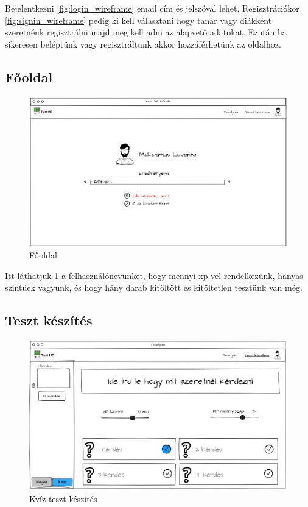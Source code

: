 Bejelentkezni \ref{fig:login_wireframe} email cím és jelszóval lehet. Regisztrációkor \ref{fig:signin_wireframe} pedig ki kell választani hogy tanár vagy diákként szeretnénk regisztrálni majd meg kell adni az alapvető adatokat.
Ezután ha sikeresen beléptünk vagy regisztráltunk akkor hozzáférhetünk az oldalhoz.

\subsection{Főoldal}

\begin{figure}[H]
    \centering
    \includegraphics[width=\linewidth]{images/main_login_wireframe.png}
    \caption{Főoldal}
    \label{fig:main_page}
\end{figure}

Itt láthatjuk \ref{fig:main_page} a felhasználónevünket, hogy mennyi xp-vel rendelkezünk, hanyas szintűek vagyunk, és hogy hány darab kitöltött és kitöltetlen tesztünk van még.

\subsection{Teszt készítés}

\begin{figure}[H]
    \centering
    \includegraphics[width=\linewidth]{images/make_test_wireframe.png}
    \caption{Kvíz teszt készítés}
    \label{fig:new_quiz_question}
\end{figure}

